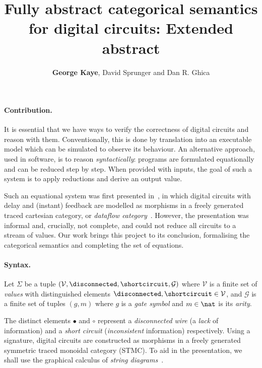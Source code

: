 \documentclass[10pt]{article}
\title{\vspace{-3em}Fully abstract categorical semantics for digital circuits: \textbf{Extended abstract}}
\author{\textbf{George Kaye}, David Sprunger and Dan R. Ghica}
\begin{document}
    \maketitle

    \paragraph*{Contribution.}
    It is essential that we have ways to verify the correctness of digital circuits and reason with them.
    Conventionally, this is done by translation into an executable model which can be simulated to observe its behaviour.
    An alternative approach, used in software, is to reason \emph{syntactically}: programs are formulated equationally and can be reduced step by step.
    When provided with inputs, the goal of such a system is to apply reductions and derive an output value.

    Such an equational system was first presented in~\cite{ghica2016categorical,ghica2017diagrammatic}, in which digital circuits with delay and (instant) feedback are modelled as morphisms in a freely generated traced cartesian category, or \emph{dataflow category}~\cite{cazanescu1994feedback,hasegawa1997recursion}.
    However, the presentation was informal and, crucially, not complete, and could not reduce all circuits to a stream of values.
    Our work brings this project to its conclusion, formalising the categorical semantics and completing the set of equations.

    \paragraph*{Syntax.}

    \begin{definition}
        Let \(\Sigma\) be a tuple \((\mathcal{V},\disconnected,\shortcircuit,\mathcal{G})\) where \(\mathcal{V}\) is a finite set of \emph{values} with distinguished elements \(\disconnected,\shortcircuit \in \mathcal{V}\), and \(\mathcal{G}\) is a finite set of tuples \((g,m)\) where \(g\) is a \emph{gate symbol} and \(m \in \nat\) is its \emph{arity}.
    \end{definition}

    \noindent
    The distinct elements \(\bullet\) and \(\circ\) represent a \emph{disconnected wire} (a \emph{lack} of information) and a \emph{short circuit} (\emph{inconsistent} information) respectively.
    Using a signature, digital circuits are constructed as morphisms in a freely generated symmetric traced monoidal category (STMC).
    To aid in the presentation, we shall use the graphical calculus of \emph{string diagrams}~\cite{joyal1991geometry,joyal1996traced,selinger2011survey}.
\end{document}
